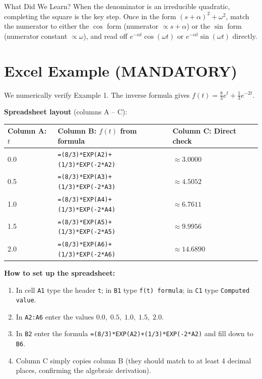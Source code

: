 \documentclass[12pt,a4paper]{article}
\begin{document}
\begin{learnbox}{What Did We Learn?}
When the denominator is an irreducible quadratic, completing the square is the
key step.  Once in the form $(s+\alpha)^{2}+\omega^{2}$, match the numerator to
either the $\cos$ form (numerator $\propto s+\alpha$) or the $\sin$ form
(numerator constant $\propto \omega$), and read off $e^{-\alpha t}\cos(\omega t)$
or $e^{-\alpha t}\sin(\omega t)$ directly.
\end{learnbox}

\section{Excel Example (MANDATORY)}

We numerically verify Example 1.  The inverse formula gives
$f(t) = \tfrac{8}{3}e^{t} + \tfrac{1}{3}e^{-2t}$.

\medskip
\noindent\textbf{Spreadsheet layout} (columns A -- C):

\begin{center}
\begin{tabular}{@{} l l l @{}}
\toprule
\textbf{Column A: $t$} & \textbf{Column B: $f(t)$ from formula} & \textbf{Column C: Direct check} \\
\midrule
0.0 & \texttt{=(8/3)*EXP(A2)+(1/3)*EXP(-2*A2)} & $\approx 3.0000$ \\
0.5 & \texttt{=(8/3)*EXP(A3)+(1/3)*EXP(-2*A3)} & $\approx 4.5052$ \\
1.0 & \texttt{=(8/3)*EXP(A4)+(1/3)*EXP(-2*A4)} & $\approx 6.7611$ \\
1.5 & \texttt{=(8/3)*EXP(A5)+(1/3)*EXP(-2*A5)} & $\approx 9.9956$ \\
2.0 & \texttt{=(8/3)*EXP(A6)+(1/3)*EXP(-2*A6)} & $\approx 14.6890$ \\
\bottomrule
\end{tabular}
\end{center}

\medskip
\noindent\textbf{How to set up the spreadsheet:}
\begin{enumerate}[leftmargin=*, label=\arabic*.]
    \item In cell \texttt{A1} type the header \texttt{t}; in \texttt{B1} type
          \texttt{f(t) formula}; in \texttt{C1} type \texttt{Computed value}.
    \item In \texttt{A2:A6} enter the values $0.0,\;0.5,\;1.0,\;1.5,\;2.0$.
    \item In \texttt{B2} enter the formula
          \texttt{=(8/3)*EXP(A2)+(1/3)*EXP(-2*A2)} and fill down to \texttt{B6}.
    \item Column C simply copies column B (they should match to at least 4
          decimal places, confirming the algebraic derivation).
\end{enumerate}
\end{document}
